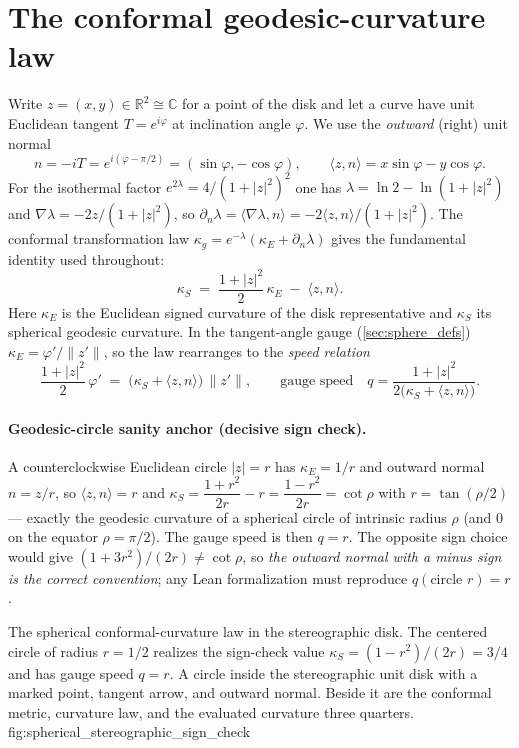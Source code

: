 \section{The conformal geodesic-curvature law}
\label{sec:sphere_conformal}

Write $z=(x,y)\in\mathbb R^2\cong\mathbb C$ for a point of the disk and let a curve have
unit Euclidean tangent $T=e^{i\varphi}$ at inclination angle $\varphi$. We use the
\emph{outward} (right) unit normal
\[
  n=-iT=e^{i(\varphi-\pi/2)}=(\sin\varphi,-\cos\varphi),\qquad
  \langle z,n\rangle=x\sin\varphi-y\cos\varphi .
\]
For the isothermal factor $e^{2\lambda}=4/(1+|z|^2)^2$ one has
$\lambda=\ln 2-\ln(1+|z|^2)$ and $\nabla\lambda=-2z/(1+|z|^2)$, so
$\partial_n\lambda=\langle\nabla\lambda,n\rangle=-2\langle z,n\rangle/(1+|z|^2)$. The
conformal transformation law $\kappa_g=e^{-\lambda}(\kappa_E+\partial_n\lambda)$ gives the
fundamental identity used throughout:
\[
  \kappa_S \;=\; \frac{1+|z|^2}{2}\,\kappa_E \;-\; \langle z,n\rangle .
\]
Here $\kappa_E$ is the Euclidean signed curvature of the disk representative and
$\kappa_S$ its spherical geodesic curvature. In the tangent-angle gauge (\cref{sec:sphere_defs})
$\kappa_E=\varphi'/\|z'\|$, so the law rearranges to the \emph{speed relation}
\[
  \frac{1+|z|^2}{2}\,\varphi' \;=\; \bigl(\kappa_S+\langle z,n\rangle\bigr)\,\|z'\| ,
  \qquad\text{gauge speed}\quad q=\frac{1+|z|^2}{2\bigl(\kappa_S+\langle z,n\rangle\bigr)} .
\]

\paragraph{Geodesic-circle sanity anchor (decisive sign check).}
A counterclockwise Euclidean circle $|z|=r$ has $\kappa_E=1/r$ and outward normal
$n=z/r$, so $\langle z,n\rangle=r$ and
$\kappa_S=\dfrac{1+r^2}{2r}-r=\dfrac{1-r^2}{2r}=\cot\rho$ with $r=\tan(\rho/2)$ — exactly
the geodesic curvature of a spherical circle of intrinsic radius $\rho$ (and $0$ on the
equator $\rho=\pi/2$). The gauge speed is then $q=r$. The opposite sign choice would give
$(1+3r^2)/(2r)\ne\cot\rho$, so \emph{the outward normal with a minus sign is the correct
convention}; any Lean formalization must reproduce $q(\text{circle }r)=r$.

  {The spherical conformal-curvature law in the stereographic disk. The centered
   circle of radius $r=1/2$ realizes the sign-check value
   $\kappa_S=(1-r^2)/(2r)=3/4$ and has gauge speed $q=r$.}
  {A circle inside the stereographic unit disk with a marked point, tangent
   arrow, and outward normal. Beside it are the conformal metric, curvature law,
   and the evaluated curvature three quarters.}
  {fig:spherical_stereographic_sign_check}

